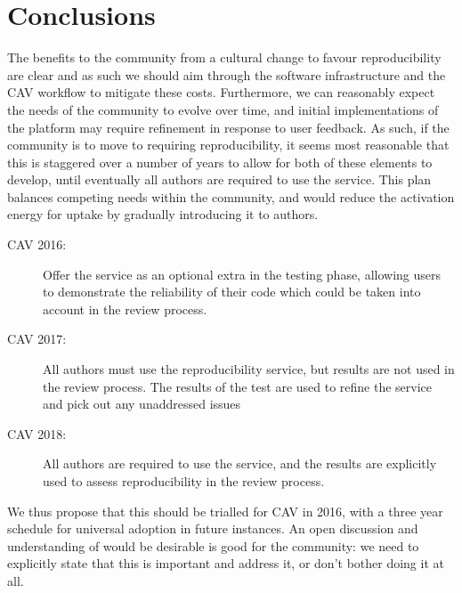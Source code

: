 \documentclass{llncs}
\begin{document}



\section{Conclusions}\label{concl}

The benefits to the community from a cultural change to favour
reproducibility are clear and as such we should aim through the
software infrastructure and the CAV workflow to mitigate these
costs. Furthermore, we can reasonably expect the needs of the
community to evolve over time, and initial implementations of the
platform may require refinement in response to user feedback. As such,
if the community is to move to requiring reproducibility, it seems
most reasonable that this is staggered over a number of years to allow
for both of these elements to develop, until eventually all authors
are required to use the service. This plan balances competing needs
within the community, and would reduce the activation energy for
uptake by gradually introducing it to authors.

\begin{description}
\item[CAV 2016:] Offer the service as an optional extra in the testing phase, allowing users to demonstrate 
the reliability of their code which could be taken into account in the review process.
\item[CAV 2017:] All authors must use the reproducibility service, but results are not used in the review
process. The results of the test are used to refine the service and pick out any unaddressed issues
\item[CAV 2018:] All authors are required to use the service, and the results are explicitly used to 
assess reproducibility in the review process.
\end{description}

We thus propose that this should be trialled for CAV in 2016, with a
three year schedule for universal adoption in future instances. An
open discussion and understanding of would be desirable is good for
the community: we need to explicitly state that this is important and
address it, or don't bother doing it at all.



\end{document}
